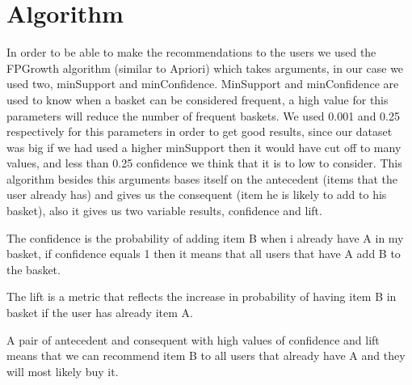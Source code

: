 \section{Algorithm}
\label{algorithm}

In order to be able to make the recommendations to the users we used the FPGrowth algorithm (similar to Apriori) which takes arguments,
in our case we used two, minSupport and minConfidence. MinSupport and minConfidence are used to know when a basket 
can be considered frequent, a high value for this parameters will reduce the number of frequent baskets.
We used 0.001 and 0.25 respectively for this parameters in order to get good results, since our dataset was big if we had used
a higher minSupport then it would have cut off to many values, and less than 0.25 confidence we think that it is to low to consider.
This algorithm besides this arguments bases itself on the antecedent (items that the user already has) and gives us
the consequent (item he is likely to add to his basket), also it gives us two variable results, confidence and lift.

The confidence is the probability of adding item B when i already have A in my basket, if confidence equals 1
then it means that all users that have A add B to the basket.

The lift is a metric that reflects the increase in probability of having item B in basket if the user has already
item A.

A pair of antecedent and consequent with high values of confidence and lift means that we can recommend item B to all
users that already have A and they will most likely buy it. 